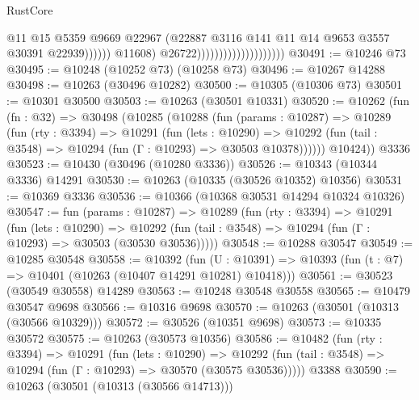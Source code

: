 \begin{lexlean}{RustCore}
\begin{coremodule}
                                                        @11
                                                        @15
                                                        @5359
                                                        @9669
                                                        @22967
                                                        (@22887
                                                          @3116
                                                          @141
                                                          @11
                                                          @14
                                                          @9653
                                                          @3557
                                                          @30391
                                                          @22939))))))
                                              @11608)
                                            @26722))))))))))))))))))))
@30491 := @10246 @73
@30495 := @10248 (@10252 @73) (@10258 @73)
@30496 := @10267 @14288
@30498 := @10263 (@30496 @10282)
@30500 := @10305 (@10306 @73)
@30501 := @10301 @30500
@30503 := @10263 (@30501 @10331)
@30520 := @10262
    (fun (fn : @32) =>
    @30498
      (@10285
        (@10288
          (fun (params : @10287) =>
          @10289
            (fun (rty : @3394) =>
            @10291
              (fun (lets : @10290) =>
              @10292 (fun (tail : @3548) => @10294 (fun (Γ : @10293) => @30503 @10378))))))
        @10424))
    @3336
@30523 := @10430 (@30496 (@10280 @3336))
@30526 := @10343 (@10344 @3336) @14291
@30530 := @10263 (@10335 (@30526 @10352) @10356)
@30531 := @10369 @3336
@30536 := @10366 (@10368 @30531 @14294 @10324 @10326)
@30547 := fun (params : @10287) =>
  @10289
    (fun (rty : @3394) =>
    @10291
      (fun (lets : @10290) =>
      @10292 (fun (tail : @3548) => @10294 (fun (Γ : @10293) => @30503 (@30530 @30536)))))
@30548 := @10288 @30547
@30549 := @10285 @30548
@30558 := @10392
    (fun (U : @10391) => @10393 (fun (t : @7) => @10401 (@10263 (@10407 @14291 @10281) @10418)))
@30561 := @30523 (@30549 @30558) @14289
@30563 := @10248 @30548 @30558
@30565 := @10479 @30547 @9698
@30566 := @10316 @9698
@30570 := @10263 (@30501 (@10313 (@30566 @10329)))
@30572 := @30526 (@10351 @9698)
@30573 := @10335 @30572
@30575 := @10263 (@30573 @10356)
@30586 := @10482
    (fun (rty : @3394) =>
    @10291
      (fun (lets : @10290) =>
      @10292 (fun (tail : @3548) => @10294 (fun (Γ : @10293) => @30570 (@30575 @30536)))))
    @3388
@30590 := @10263 (@30501 (@10313 (@30566 @14713)))

\end{coremodule}
\end{lexlean}
